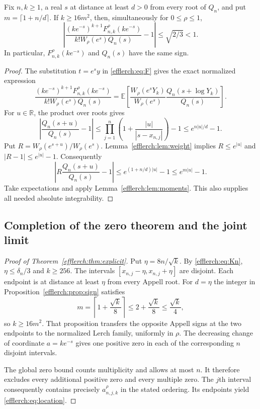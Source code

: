 \begin{proposition}
\label{efflerch:prop:sign}
Fix $n,k\geq1$, a real $s$ at distance at least $d>0$ from every
root of $Q_n$, and put $m=\lceil1+n/d\rceil$.
If $k\geq16m^2$, then, simultaneously for $0\leq\rho\leq1$,
\begin{equation}\label{efflerch:eq:relative}
 \left|
  \frac{(ke^{-s})^{k+1}F_{n,k}^\rho(ke^{-s})}
       {k! W_\rho(e^s)Q_n(s)}-1
 \right|\leq\sqrt{2/3}<1.
\end{equation}
In particular, $F_{n,k}^\rho(ke^{-s})$ and $Q_n(s)$ have the same sign.
\end{proposition}
\begin{proof}
The substitution $t=e^s y$ in \eqref{efflerch:eq:F} gives the exact
normalized expression
\[
 \frac{(ke^{-s})^{k+1}F_{n,k}^\rho(ke^{-s})}
      {k!W_\rho(e^s)Q_n(s)}
 =\mathbb E\left[
  \frac{W_\rho(e^sY_k)}{W_\rho(e^s)}
  \frac{Q_n(s+\log Y_k)}{Q_n(s)}\right].
\]
For $u\in\mathbb R$, the product over roots gives
\[
 \left|\frac{Q_n(s+u)}{Q_n(s)}-1\right|
  \leq\prod_{j=1}^n\left(1+\frac{|u|}{|s-x_{n,j}|}\right)-1
  \leq e^{n|u|/d}-1.
\]
Put $R=W_\rho(e^{s+u})/W_\rho(e^s)$.  Lemma~\ref{efflerch:lem:weight}
implies $R\leq e^{|u|}$ and $|R-1|\leq e^{|u|}-1$.
Consequently
\[
 \left|R\frac{Q_n(s+u)}{Q_n(s)}-1\right|
  \leq e^{(1+n/d)|u|}-1\leq e^{m|u|}-1.
\]
Take expectations and apply Lemma~\ref{efflerch:lem:moments}.
This also supplies all needed absolute integrability.
\end{proof}

\subsection{Completion of the zero theorem and the joint limit}

\begin{proof}[Proof of Theorem~\ref{efflerch:thm:explicit}]
Put $\eta=8n/\sqrt{k}$.  By \eqref{efflerch:eq:Kn},
$\eta\leq\delta_n/3$ and $k\geq256$.
The intervals $[x_{n,j}-\eta,x_{n,j}+\eta]$ are disjoint.
Each endpoint is at distance at least $\eta$ from every Appell root.
For $d=\eta$ the integer in Proposition~\ref{efflerch:prop:sign} satisfies
\[
 m=\left\lceil1+\frac{\sqrt{k}}8\right\rceil
  \leq2+\frac{\sqrt{k}}8\leq\frac{\sqrt{k}}4,
\]
so $k\geq16m^2$.  That proposition transfers the opposite Appell
signs at the two endpoints to the normalized Lerch family, uniformly
in $\rho$.  The decreasing change of coordinate $a=ke^{-s}$ gives
one positive zero in each of the corresponding $n$ disjoint intervals.

The global zero bound counts multiplicity and allows at most $n$.
It therefore excludes every additional positive zero and every
multiple zero.  The $j$th interval consequently contains precisely
$a_{n,j,k}^\rho$ in the stated ordering.  Its endpoints yield
\eqref{efflerch:eq:location}.
\end{proof}

